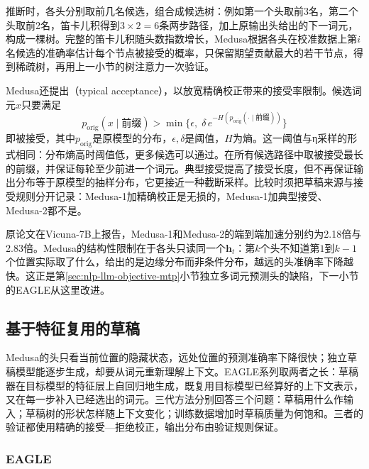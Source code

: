 推断时，各头分别取前几名候选，组合成候选树：例如第一个头取前3名，第二个头取前2名，笛卡儿积得到$3\times2=6$条两步路径，加上原输出头给出的下一词元，构成一棵树。完整的笛卡儿积随头数指数增长，Medusa根据各头在校准数据上第$i$名候选的准确率估计每个节点被接受的概率，只保留期望贡献最大的若干节点，得到稀疏树，再用上一小节的树注意力一次验证。

Medusa还提出（typical acceptance），以放宽精确校正带来的接受率限制。候选词元$x$只要满足
\begin{equation}
 p_{\mathrm{orig}}(x\mid\text{前缀})>\min\bigl\{\epsilon,\;\delta\,e^{-H(p_{\mathrm{orig}}(\cdot\mid\text{前缀}))}\bigr\}
 \label{eq:nlp-inference-typical-acceptance}
\end{equation}
即被接受，其中$p_{\mathrm{orig}}$是原模型的分布，$\epsilon,\delta$是阈值，$H$为熵。这一阈值与η采样的形式相同：分布熵高时阈值低，更多候选可以通过。在所有候选路径中取被接受最长的前缀，并保证每轮至少前进一个词元。典型接受提高了接受长度，但不再保证输出分布等于原模型的抽样分布，它更接近一种截断采样。比较时须把草稿来源与接受规则分开记录：Medusa-1加精确校正是无损的，Medusa-1加典型接受、Medusa-2都不是。

原论文在Vicuna-7B上报告，Medusa-1和Medusa-2的端到端加速分别约为2.18倍与2.83倍。Medusa的结构性限制在于各头只读同一个$\bm h_t$：第$k$个头不知道第$1$到$k-1$个位置实际取了什么，给出的是边缘分布而非条件分布，越远的头准确率下降越快。这正是第\ref{sec:nlp-llm-objective-mtp}小节独立多词元预测头的缺陷，下一小节的EAGLE从这里改进。

\subsection{基于特征复用的草稿}
\label{sec:nlp-inference-eagle}

Medusa的头只看当前位置的隐藏状态，远处位置的预测准确率下降很快；独立草稿模型能逐步生成，却要从词元重新理解上下文。EAGLE系列取两者之长：草稿器在目标模型的特征层上自回归地生成，既复用目标模型已经算好的上下文表示，又在每一步补入已经选出的词元。三代方法分别回答三个问题：草稿用什么作输入；草稿树的形状怎样随上下文变化；训练数据增加时草稿质量为何饱和。三者的验证都使用精确的接受—拒绝校正，输出分布由验证规则保证。

\subsubsection{EAGLE}
\label{sec:nlp-inference-eagle1}

